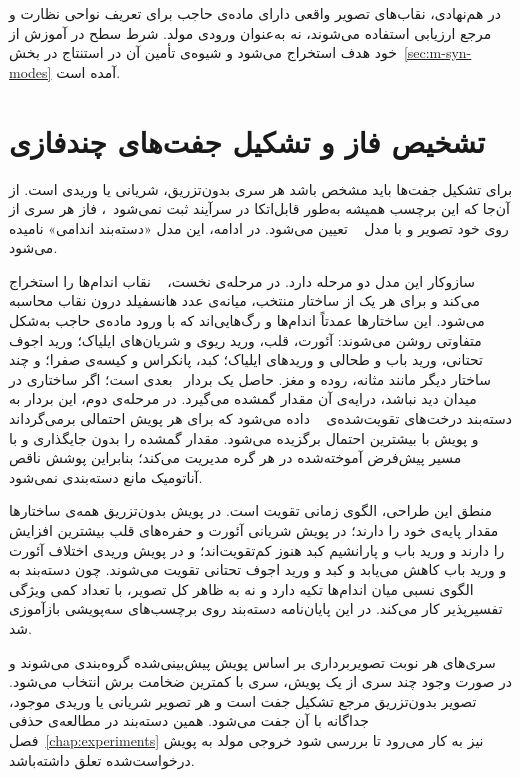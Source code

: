در هم‌نهادی، نقاب‌های تصویر واقعی دارای ماده‌ی حاجب برای تعریف نواحی نظارت و مرجع ارزیابی استفاده می‌شوند، نه به‌عنوان ورودی مولد. شرط سطح در آموزش از خود هدف استخراج می‌شود و شیوه‌ی تأمین آن در استنتاج در بخش~\ref{sec:m-syn-modes} آمده است.

\section{تشخیص فاز و تشکیل جفت‌های چندفازی}
\label{sec:m-phase}

برای تشکیل جفت‌ها باید مشخص باشد هر سری بدون‌تزریق، شریانی یا وریدی است. از آن‌جا که این برچسب همیشه به‌طور قابل‌اتکا در سرآیند  ثبت نمی‌شود~\cite{muhamedrahimov2022contrastphases}، فاز هر سری از روی خود تصویر و با مدل ~\cite{phasedet2024xgboost} تعیین می‌شود. در ادامه، این مدل «دسته‌بند اندامی» نامیده می‌شود.

سازوکار این مدل دو مرحله دارد. در مرحله‌ی نخست، ~\cite{wasserthal2023} نقاب اندام‌ها را استخراج می‌کند و برای هر یک از  ساختار منتخب، میانه‌ی عدد هانسفیلد درون نقاب محاسبه می‌شود. این ساختارها عمدتاً اندام‌ها و رگ‌هایی‌اند که با ورود ماده‌ی حاجب به‌شکل متفاوتی روشن می‌شوند: آئورت، قلب، ورید ریوی و شریان‌های ایلیاک؛ ورید اجوف تحتانی، ورید باب و طحالی و وریدهای ایلیاک؛ کبد، پانکراس و کیسه‌ی صفرا؛ و چند ساختار دیگر مانند مثانه، روده و مغز. حاصل یک بردار ~بعدی است؛ اگر ساختاری در میدان دید نباشد، درایه‌ی آن مقدار گمشده می‌گیرد. در مرحله‌ی دوم، این بردار به دسته‌بند درخت‌های تقویت‌شده‌ی ~\cite{chen2016xgboost} داده می‌شود که برای هر پویش احتمالی برمی‌گرداند و پویش با بیشترین احتمال برگزیده می‌شود.  مقدار گمشده را بدون جایگذاری و با مسیر پیش‌فرض آموخته‌شده در هر گره مدیریت می‌کند؛ بنابراین پوشش ناقص آناتومیک مانع دسته‌بندی نمی‌شود.

منطق این طراحی، الگوی زمانی تقویت است. در پویش بدون‌تزریق همه‌ی ساختارها مقدار پایه‌ی خود را دارند؛ در پویش شریانی آئورت و حفره‌های قلب بیشترین افزایش را دارند و ورید باب و پارانشیم کبد هنوز کم‌تقویت‌اند؛ و در پویش وریدی اختلاف آئورت و ورید باب کاهش می‌یابد و کبد و ورید اجوف تحتانی تقویت می‌شوند. چون دسته‌بند به الگوی نسبی میان اندام‌ها تکیه دارد و نه به ظاهر کل تصویر، با تعداد کمی ویژگی تفسیرپذیر کار می‌کند. در این پایان‌نامه دسته‌بند روی برچسب‌های سه‌پویشی  بازآموزی شد.

سری‌های هر نوبت تصویربرداری بر اساس پویش پیش‌بینی‌شده گروه‌بندی می‌شوند و در صورت وجود چند سری از یک پویش، سری با کمترین ضخامت برش انتخاب می‌شود. تصویر بدون‌تزریق مرجع تشکیل جفت است و هر تصویر شریانی یا وریدی موجود، جداگانه با آن جفت می‌شود. همین دسته‌بند در مطالعه‌ی حذفی فصل~\ref{chap:experiments} نیز به کار می‌رود تا بررسی شود خروجی مولد به پویش درخواست‌شده تعلق داشته‌باشد.

